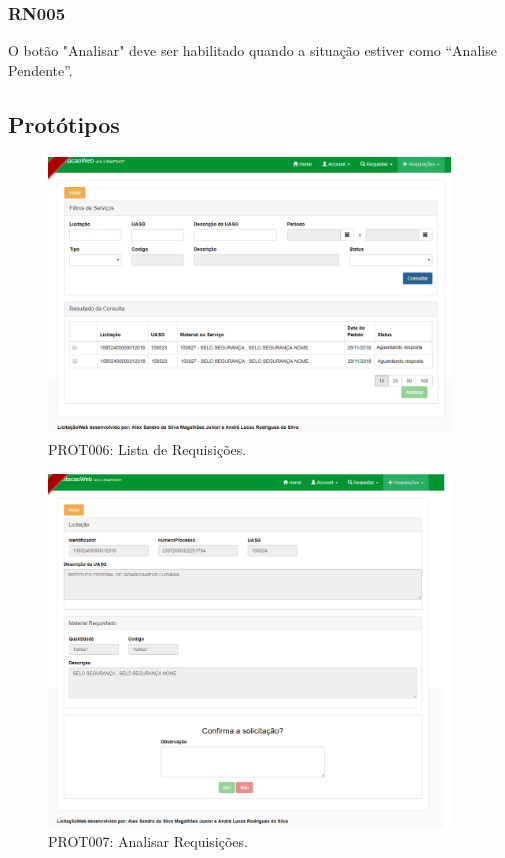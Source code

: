 \begin{anexosenv}
\subsubsection*{RN005}\label{rn012}
O botão "Analisar" deve ser habilitado quando a situação estiver como “Analise Pendente”.

\subsection*{Protótipos}
\begin{figure}[htbp]
    \centering
    \includegraphics[width=0.95\textwidth]{figuras/prototipo006.png}
    \caption[PROT006]{PROT006: Lista de Requisições.}
    \label{PROT006}
\end{figure}

\begin{figure}[htbp]
    \centering
    \includegraphics[width=0.95\textwidth]{figuras/prototipo007.png}
    \caption[PROT007]{PROT007: Analisar Requisições.}
    \label{PROT007}
\end{figure}


\end{anexosenv}
